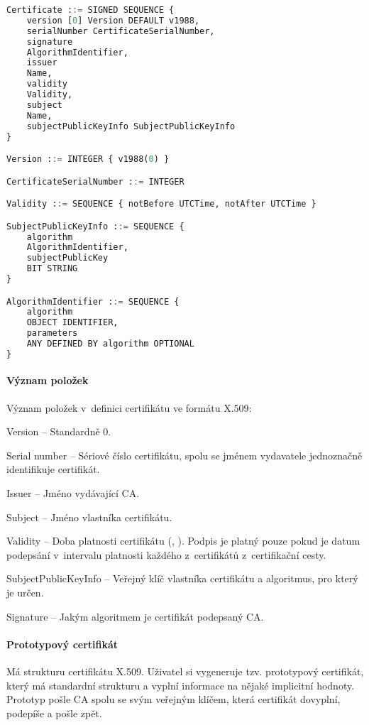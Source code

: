 \bigskip\noindent\begin{minipage}{\linewidth}
\begin{lstlisting}[language=Python, caption={Příklad definice certifikátu ve formátu X.509.}]
Certificate ::= SIGNED SEQUENCE {
    version [0] Version DEFAULT v1988,
    serialNumber CertificateSerialNumber,
    signature
    AlgorithmIdentifier,
    issuer
    Name,
    validity
    Validity,
    subject
    Name,
    subjectPublicKeyInfo SubjectPublicKeyInfo
}

Version ::= INTEGER { v1988(0) }

CertificateSerialNumber ::= INTEGER

Validity ::= SEQUENCE { notBefore UTCTime, notAfter UTCTime }

SubjectPublicKeyInfo ::= SEQUENCE {
    algorithm
    AlgorithmIdentifier,
    subjectPublicKey
    BIT STRING
}

AlgorithmIdentifier ::= SEQUENCE {
    algorithm
    OBJECT IDENTIFIER,
    parameters
    ANY DEFINED BY algorithm OPTIONAL
}
\end{lstlisting}
\end{minipage}

\paragraph*{Význam položek} Význam položek v~definici certifikátu ve formátu X.509: \begin{compactitem}
    \item Version -- Standardně 0.
    \item Serial number -- Sériové číslo certifikátu, spolu se jménem vydavatele jednoznačně identifikuje certifikát.
    \item Issuer -- Jméno vydávající CA.
    \item Subject -- Jméno vlastníka certifikátu.
    \item Validity -- Doba platnosti certifikátu (, ). Podpis je platný pouze pokud je datum podepsání v~intervalu platnosti každého z~certifikátů z~certifikační cesty.
    \item SubjectPublicKeyInfo -- Veřejný klíč vlastníka certifikátu a algoritmus, pro který je určen.
    \item Signature -- Jakým algoritmem je certifikát podepsaný CA.
\end{compactitem}

\paragraph*{Prototypový certifikát} Má strukturu certifikátu X.509. Uživatel si vygeneruje tzv. prototypový certifikát, který má standardní strukturu a vyplní informace na nějaké implicitní hodnoty. Prototyp pošle CA spolu se svým veřejným klíčem, která certifikát dovyplní, podepíše a pošle zpět.


